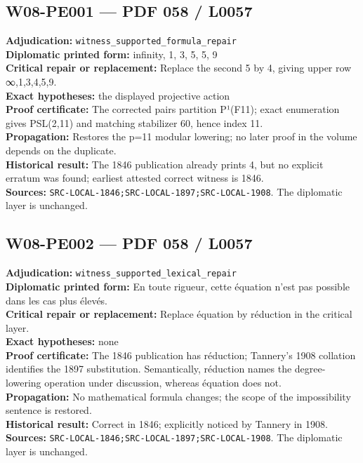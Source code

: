 \documentclass[
  10pt,
  a4paper,
]{scrreprt}
\begin{document}
\subsection{W08-PE001 --- PDF 058 /
L0057}\label{w08-pe001-pdf-058-l0057}

\textbf{Adjudication:} \texttt{witness\_supported\_formula\_repair}\\
\textbf{Diplomatic printed form:} infinity, 1, 3, 5, 5, 9\\
\textbf{Critical repair or replacement:} Replace the second 5 by 4,
giving upper row ∞,1,3,4,5,9.\\
\textbf{Exact hypotheses:} the displayed projective action\\
\textbf{Proof certificate:} The corrected pairs partition P¹(F11); exact
enumeration gives \textbar PSL(2,11) and matching stabilizer
60, hence index 11.\\
\textbf{Propagation:} Restores the p=11 modular lowering; no later proof
in the volume depends on the duplicate.\\
\textbf{Historical result:} The 1846 publication already prints 4, but
no explicit erratum was found; earliest attested correct witness is
1846.\\
\textbf{Sources:} \texttt{SRC-LOCAL-1846;SRC-LOCAL-1897;SRC-LOCAL-1908}.
The diplomatic layer is unchanged.

\subsection{W08-PE002 --- PDF 058 /
L0057}\label{w08-pe002-pdf-058-l0057}

\textbf{Adjudication:} \texttt{witness\_supported\_lexical\_repair}\\
\textbf{Diplomatic printed form:} En toute rigueur, cette équation n'est
pas possible dans les cas plus élevés.\\
\textbf{Critical repair or replacement:} Replace équation by réduction
in the critical layer.\\
\textbf{Exact hypotheses:} none\\
\textbf{Proof certificate:} The 1846 publication has réduction;
Tannery's 1908 collation identifies the 1897 substitution. Semantically,
réduction names the degree-lowering operation under discussion, whereas
équation does not.\\
\textbf{Propagation:} No mathematical formula changes; the scope of the
impossibility sentence is restored.\\
\textbf{Historical result:} Correct in 1846; explicitly noticed by
Tannery in 1908.\\
\textbf{Sources:} \texttt{SRC-LOCAL-1846;SRC-LOCAL-1897;SRC-LOCAL-1908}.
The diplomatic layer is unchanged.
\end{document}
